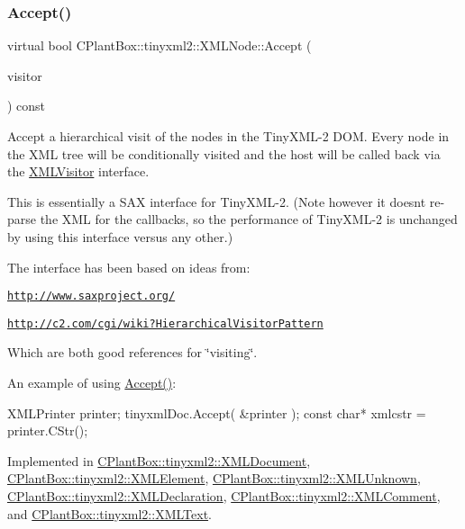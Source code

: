 \subsubsection{\texorpdfstring{Accept()}{Accept()}}
{\footnotesize\ttfamily virtual bool C\+Plant\+Box\+::tinyxml2\+::\+X\+M\+L\+Node\+::\+Accept (\begin{DoxyParamCaption}\item[{\hyperlink{classCPlantBox_1_1tinyxml2_1_1XMLVisitor}{X\+M\+L\+Visitor} $\ast$}]{visitor }\end{DoxyParamCaption}) const\hspace{0.3cm}{\ttfamily [pure virtual]}}

Accept a hierarchical visit of the nodes in the Tiny\+X\+M\+L-\/2 D\+OM. Every node in the X\+ML tree will be conditionally visited and the host will be called back via the \hyperlink{classCPlantBox_1_1tinyxml2_1_1XMLVisitor}{X\+M\+L\+Visitor} interface.

This is essentially a S\+AX interface for Tiny\+X\+M\+L-\/2. (Note however it doesn\textquotesingle{}t re-\/parse the X\+ML for the callbacks, so the performance of Tiny\+X\+M\+L-\/2 is unchanged by using this interface versus any other.)

The interface has been based on ideas from\+:


\begin{DoxyItemize}
\item \href{http://www.saxproject.org/}{\tt http\+://www.\+saxproject.\+org/}
\item \href{http://c2.com/cgi/wiki?HierarchicalVisitorPattern}{\tt http\+://c2.\+com/cgi/wiki?\+Hierarchical\+Visitor\+Pattern}
\end{DoxyItemize}

Which are both good references for \char`\"{}visiting\char`\"{}.

An example of using \hyperlink{classCPlantBox_1_1tinyxml2_1_1XMLNode_a2cdc6f044bd1f971e211328e42a4f9d5}{Accept()}\+: \begin{DoxyVerb}XMLPrinter printer;
tinyxmlDoc.Accept( &printer );
const char* xmlcstr = printer.CStr();
\end{DoxyVerb}
 

Implemented in \hyperlink{classCPlantBox_1_1tinyxml2_1_1XMLDocument_acca54ff6fe186645813bc5ce00326653}{C\+Plant\+Box\+::tinyxml2\+::\+X\+M\+L\+Document}, \hyperlink{classCPlantBox_1_1tinyxml2_1_1XMLElement_a1dd18a30230bb93e53c2676bd9edb1ae}{C\+Plant\+Box\+::tinyxml2\+::\+X\+M\+L\+Element}, \hyperlink{classCPlantBox_1_1tinyxml2_1_1XMLUnknown_a706a5d7b3056facf31ba66a316ddf912}{C\+Plant\+Box\+::tinyxml2\+::\+X\+M\+L\+Unknown}, \hyperlink{classCPlantBox_1_1tinyxml2_1_1XMLDeclaration_abc9e048a89ad5e21f3459c857465dd71}{C\+Plant\+Box\+::tinyxml2\+::\+X\+M\+L\+Declaration}, \hyperlink{classCPlantBox_1_1tinyxml2_1_1XMLComment_a139f01ec7e0efdd01914e8d2cfd74791}{C\+Plant\+Box\+::tinyxml2\+::\+X\+M\+L\+Comment}, and \hyperlink{classCPlantBox_1_1tinyxml2_1_1XMLText_a4cb4d0408713d6372e5894fda37cb911}{C\+Plant\+Box\+::tinyxml2\+::\+X\+M\+L\+Text}.

